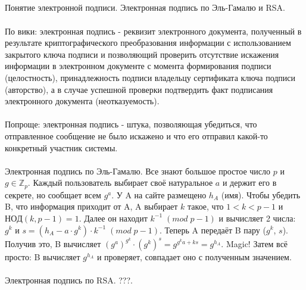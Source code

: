 \documentclass[a4paper,10pt]{article} %
\begin{document}
	\subsection{}
	Понятие электронной подписи. Электронная подпись по Эль-Гамалю и RSA.
	\\\\
	По вики: электронная подпись - реквизит электронного документа, полученный в результате криптографического преобразования информации с использованием закрытого ключа подписи и позволяющий проверить отсутствие искажения информации в электронном документе с момента формирования подписи (целостность), принадлежность подписи владельцу сертификата ключа подписи (авторство), а в случае успешной проверки подтвердить факт подписания электронного документа (неотказуемость).
	\\\\
	Попроще: электронная подпись - штука, позволяющая убедиться, что отправленное сообщение не было искажено и что его отправил какой-то конкретный участник системы.
	\\\\
	Электронная подпись по Эль-Гамалю. Все знают большое простое число $p$ и $g \in \mathbb{Z}_{p}$. Каждый пользователь выбирает своё натуральное $a$ и держит его в секрете, но сообщает всем $g^{a}$. У A на сайте размещено $h_{A}$ (имя). Чтобы убедить B, что информация приходит от A, A выбирает $k$ такое, что $1 < k < p - 1$ и $НОД(k, p - 1) = 1$. Далее он находит $k^{-1} \; (mod \; p - 1)$ и вычисляет 2 числа: $g^{k}$ и $s = (h_{A} - a \cdot g^{k}) \cdot k^{-1} \; (mod \; p - 1)$. Теперь A передаёт B пару ($g^{k}$, $s$). Получив это, B вычисляет $(g^{a})^{g^{k}} \cdot (g^{k})^{s} = g^{g^{k}a + ks} = g^{h_{A}}$. Magic! Затем всё просто: B вычисляет $g^{h_{A}}$ и проверяет, совпадает оно с полученным значением.
	\\\\
	Электронная подпись по RSA. ???.
\end{document}

